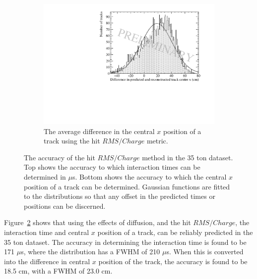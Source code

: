 \begin{figure}[h!]
  \begin{subfigure}{0.6\textwidth}
    \centering
    \includegraphics[width=\textwidth]{Data_AvXPosDiff_RMS_Int}
    \caption{The average difference in the central $x$ position of a track using the hit $RMS/Charge$ metric.}
    \label{fig:DiffDataAvDiff_RMS_Int_X}
  \end{subfigure}
  \caption[The accuracy of the hit $RMS/Charge$ method in the 35 ton dataset]
          {The accuracy of the hit $RMS/Charge$ method in the 35 ton dataset. Top shows the accuracy to which interaction times can be determined in $\mu$s. Bottom shows the accuracy to which the central $x$ position of a track can be determined. Gaussian functions are fitted to the distributions so that any offset in the predicted times or positions can be discerned.}
  \label{fig:DiffDataAvDiff_RMS_Int}
\end{figure}

Figure~\ref{fig:DiffDataAvDiff_RMS_Int} shows that using the effects of diffusion, and the hit $RMS/Charge$, the interaction time and central $x$ position of a track, can be reliably predicted in the 35 ton dataset. The accuracy in determining the interaction time is found to be 171 $\mu$s, where the distribution has a FWHM of 210 $\mu$s. When this is converted into the difference in central $x$ position of the track, the accuracy is found to be 18.5 cm, with a FWHM of 23.0 cm. \\


